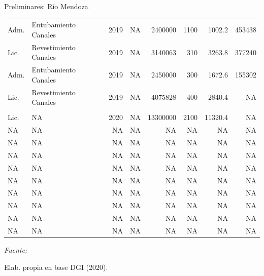 \documentclass{beamer}\usepackage[]{graphicx}\usepackage[]{color}
\begin{document}
\begin{frame}{Preliminares: Río Mendoza}
\begin{table}[H]
{\begin{threeparttable}
\begin{tabular}{llrrrrrr}
\hspace{1em}Adm. & Entubamiento Canales & 2019 & NA & 2400000 & 1100 & 1002.2 & 453438\\
\hspace{1em}Lic. & Revestimiento Canales & 2019 & NA & 3140063 & 310 & 3263.8 & 377240\\
\hspace{1em}Adm. & Entubamiento Canales & 2019 & NA & 2450000 & 300 & 1672.6 & 155302\\
\hspace{1em}Lic. & Revestimiento Canales & 2019 & NA & 4075828 & 400 & 2840.4 & NA\\
\addlinespace[0.3em]
\multicolumn{8}{l}{\textbf{2020}}\\
\hspace{1em}Lic. & NA & 2020 & NA & 13300000 & 2100 & 11320.4 & NA\\
\hspace{1em}NA & NA & NA & NA & NA & NA & NA & \vphantom{8}NA\\
\hspace{1em}NA & NA & NA & NA & NA & NA & NA & \vphantom{7}NA\\
\hspace{1em}NA & NA & NA & NA & NA & NA & NA & \vphantom{6}NA\\
\hspace{1em}NA & NA & NA & NA & NA & NA & NA & \vphantom{5}NA\\
\hspace{1em}NA & NA & NA & NA & NA & NA & NA & \vphantom{4}NA\\
\hspace{1em}NA & NA & NA & NA & NA & NA & NA & \vphantom{3}NA\\
\hspace{1em}NA & NA & NA & NA & NA & NA & NA & \vphantom{2}NA\\
\hspace{1em}NA & NA & NA & NA & NA & NA & NA & \vphantom{1}NA\\
\hspace{1em}NA & NA & NA & NA & NA & NA & NA & NA\\
\bottomrule
\end{tabular}
\begin{tablenotes}[para]
\item \textit{Fuente: } 
\item Elab. propia en base DGI (2020).
\end{tablenotes}
\end{threeparttable}}
\endgroup{}
\end{table}


\end{frame}
\end{document}
